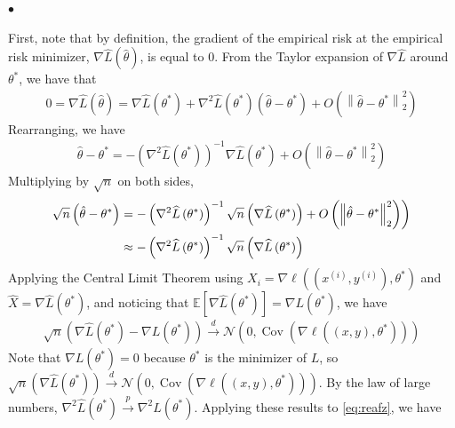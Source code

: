 \documentclass{article}
\begin{document}
$\bullet$ 

First, note that by definition, the gradient of the empirical risk at the empirical risk minimizer, $\nabla \widehat{L}(\hat{\theta})$, is equal to $0 .$ From the Taylor expansion of $\nabla \widehat{L}$ around $\theta^{*}$, we have that
\begin{align*}
0=\nabla \widehat{L}(\hat{\theta})=\nabla \widehat{L}\left(\theta^{*}\right)+\nabla^{2} \widehat{L}\left(\theta^{*}\right)\left(\hat{\theta}-\theta^{*}\right)+O\left(\left\|\hat{\theta}-\theta^{*}\right\|_{2}^{2}\right)
\end{align*}
Rearranging, we have
\begin{align*}
\hat{\theta}-\theta^{*}=-\left(\nabla^{2} \widehat{L}\left(\theta^{*}\right)\right)^{-1} \nabla \widehat{L}\left(\theta^{*}\right)+O\left(\left\|\hat{\theta}-\theta^{*}\right\|_{2}^{2}\right)
\end{align*}
Multiplying by $\sqrt{n}$ on both sides,
\begin{align}
\sqrt{n}\left(\hat{\theta}-\theta^{*}\right) &\left.=-\left(\nabla^{2} \widehat{L}\left(\theta^{*}\right)\right)^{-1} \sqrt{n}\left(\nabla \widehat{L}\left(\theta^{*}\right)\right)+O\left(\left\|\hat{\theta}-\theta^{*}\right\|_{2}^{2}\right)\right) \nonumber\\ 
& \approx-\left(\nabla^{2} \widehat{L}\left(\theta^{*}\right)\right)^{-1} \sqrt{n}\left(\nabla \widehat{L}\left(\theta^{*}\right)\right)\label{eq:reafz}
\end{align}
Applying the Central Limit Theorem  using $X_{i}=\nabla \ell\left(\left(x^{(i)}, y^{(i)}\right), \theta^{*}\right)$ and $\widehat{X}=\nabla \widehat{L}\left(\theta^{*}\right)$, and noticing that $\mathbb{E}\left[\nabla \widehat{L}\left(\theta^{*}\right)\right]=\nabla L\left(\theta^{*}\right)$, we have
\begin{align*}
\sqrt{n}\left(\nabla \widehat{L}\left(\theta^{*}\right)-\nabla L\left(\theta^{*}\right)\right) \stackrel{d}{\rightarrow} \mathcal{N}\left(0, \operatorname{Cov}\left(\nabla\ell\left((x, y), \theta^{*}\right)\right)\right)
\end{align*}
Note that $\nabla L\left(\theta^{*}\right)=0$ because $\theta^{*}$ is the minimizer of $L$, so $\sqrt{n}\left(\nabla \widehat{L}\left(\theta^{*}\right)\right) \stackrel{d}{\rightarrow} \mathcal{N}\left(0, \operatorname{Cov}\left(\nabla\ell\left((x, y), \theta^{*}\right)\right)\right) .$ By the law of large numbers, $\nabla^{2} \widehat{L}\left(\theta^{*}\right) \stackrel{p}{\rightarrow} \nabla^{2} L\left(\theta^{*}\right) .$ Applying these results to \cref{eq:reafz}, we have
\end{document}
